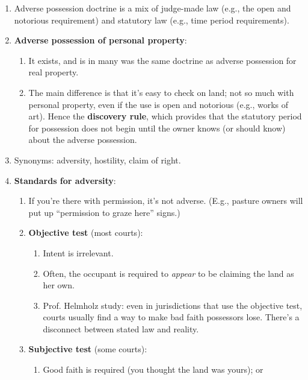 \begin{enumerate}
    run between six and 10.\footnote{Casebook p. 120 n. 4. Peterson mentioned 
    that it may be as high as 60 years for undeveloped land in New Jersey.}
    \item Adverse possession doctrine is a mix of judge-made law (e.g., the open 
    and notorious requirement) and statutory law (e.g., time period 
    requirements).
    \item \textbf{Adverse possession of personal property}:
    \begin{enumerate}
        \item It exists, and is in many was the same doctrine as adverse 
        possession for real property.
        \item The main difference is that it's easy to check on 
        land; not so much with personal property, even if the use is open and 
        notorious (e.g., works of art). Hence the \textbf{discovery rule}, which 
        provides that the statutory period for possession does not begin until 
        the owner knows (or should know) about the adverse possession.
    \end{enumerate}
    \item Synonyms: adversity, hostility, claim of right.
    \item \textbf{Standards for adversity}:
    \begin{enumerate}
        \item If you're there with permission, it's not adverse. (E.g., 
        pasture owners will put up ``permission to graze here'' signs.)
        \item \textbf{Objective test} (most courts):
        \begin{enumerate}
            \item Intent is irrelevant.
            \item Often, the occupant is required to \emph{appear} to be 
            claiming the land as her own.
            \item Prof. Helmholz study: even in jurisdictions that use the 
            objective test, courts usually find a way to make bad faith 
            possessors lose. There's a disconnect between stated law and 
            reality.
        \end{enumerate}
        \item \textbf{Subjective test} (some courts):
        \begin{enumerate}
            \item Good faith is required (you thought the land was yours); or

\end{enumerate}
\end{enumerate}
\end{enumerate}
